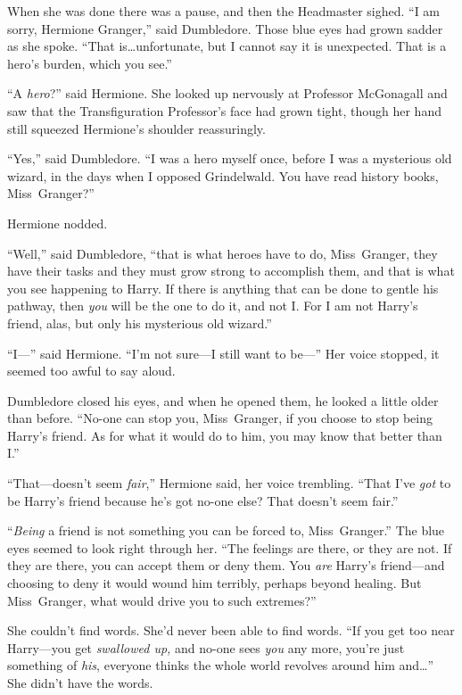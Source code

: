 When she was done there was a pause, and then the Headmaster sighed. “I am sorry, Hermione Granger,” said Dumbledore. Those blue eyes had grown sadder as she spoke. “That is…unfortunate, but I cannot say it is unexpected. That is a hero’s burden, which you see.”

“A \emph{hero}?” said Hermione. She looked up nervously at Professor McGonagall and saw that the Transfiguration Professor’s face had grown tight, though her hand still squeezed Hermione’s shoulder reassuringly.

“Yes,” said Dumbledore. “I was a hero myself once, before I was a mysterious old wizard, in the days when I opposed Grindelwald. You have read history books, Miss~Granger?”

Hermione nodded.

“Well,” said Dumbledore, “that is what heroes have to do, Miss~Granger, they have their tasks and they must grow strong to accomplish them, and that is what you see happening to Harry. If there is anything that can be done to gentle his pathway, then \emph{you} will be the one to do it, and not I\@. For I am not Harry’s friend, alas, but only his mysterious old wizard.”

“I—” said Hermione. “I’m not sure—I still want to be—” Her voice stopped, it seemed too awful to say aloud.

Dumbledore closed his eyes, and when he opened them, he looked a little older than before. “No-one can stop you, Miss~Granger, if you choose to stop being Harry’s friend. As for what it would do to him, you may know that better than I.”

“That—doesn’t seem \emph{fair},” Hermione said, her voice trembling. “That I’ve \emph{got} to be Harry’s friend because he’s got no-one else? That doesn’t seem fair.”

“\emph{Being} a friend is not something you can be forced to, Miss~Granger.” The blue eyes seemed to look right through her. “The feelings are there, or they are not. If they are there, you can accept them or deny them. You \emph{are} Harry’s friend—and choosing to deny it would wound him terribly, perhaps beyond healing. But Miss~Granger, what would drive you to such extremes?”

She couldn’t find words. She’d never been able to find words. “If you get too near Harry—you get \emph{swallowed up,} and no-one sees \emph{you} any more, you’re just something of \emph{his}, everyone thinks the whole world revolves around him and…” She didn’t have the words.

